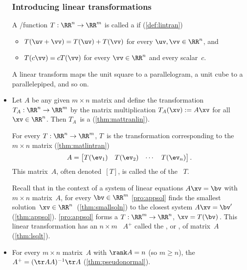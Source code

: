 \begin{itemize}
\subsubsection{Introducing linear transformations}

\itemme A \slash function \(T:\RR^n\to\RR^m\) is called a  if (\cref{def:lintran})
\begin{itemize}
\item \(T(\uv+\vv)=T(\uv)+T(\vv)\) for every \(\uv,\vv\in\RR^n\), and
\item \(T(c\vv)=cT(\vv)\) for every \(\vv\in\RR^n\) and every scalar~\(c\).
\end{itemize}
A linear transform maps the unit square to a parallelogram, a unit cube to a parallelepiped, and so on.

\item Let \(A\) be any given \(m\times n\) matrix and define the transformation \(T_A:\RR^n\to\RR^m\)  by the matrix multiplication \(T_A(\xv):=A\xv\) for all \(\xv\in\RR^n\). 
Then \(T_A\)~is a  (\cref{thm:mattranlin}). 

\itemme For every   \(T:\RR^n\to\RR^m\),
\(T\)~is the transformation corresponding to the \(m\times n\)  matrix (\cref{thm:matlintran})
\begin{equation*}
A=\begin{bmatrix} T(\ev_1)& T(\ev_2)&\cdots&T(\ev_n) \end{bmatrix}.
\end{equation*}
This matrix~\(A\), often denoted~\([T]\), is called the  of the ~\(T\).

\itemme Recall that in the context of a system of linear equations \(A\xv=\bv\) with \(m\times n\) matrix~\(A\), for every \(\bv\in\RR^m\) \cref{pro:appsol} finds the smallest solution~\(\xv\in\RR^n\)\ (\cref{thm:smallsoln}) to the closest  system \(A\xv=\bv'\) (\cref{thm:appsol}).
\cref{pro:appsol} forms a  \(T:\RR^m\to\RR^n\), \(\xv=T(\bv)\)\,.
This linear transformation has an \(n\times m\) ~\(A^+\) called the , or , of matrix~\(A\) (\cref{thm:lsqlt}).

\item For every \(m\times n\) matrix~\(A\) with \(\rank A=n\) (so \(m\geq n\)), the  \(A^+=(\tr AA)^{-1}\tr A\) (\cref{thm:pseudonormal}).


\end{itemize}
